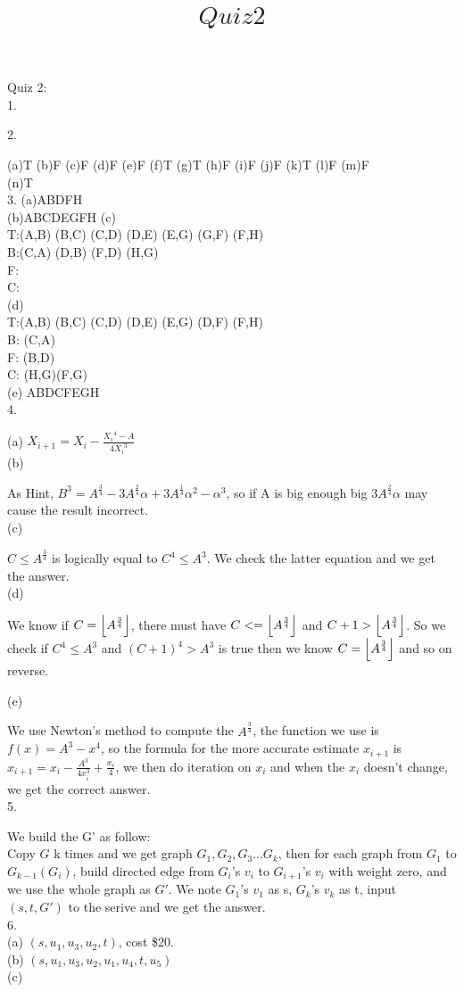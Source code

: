\documentclass[12pt,twoside]{article}
\begin{document}
\title{$Quiz 2$}
Quiz 2:\\
1.

2.

(a)T (b)F (c)F (d)F (e)F (f)T (g)T (h)F (i)F (j)F (k)T (l)F (m)F\\
(n)T\\
3.
(a)ABDFH\\
(b)ABCDEGFH
(c)\\
T:(A,B) (B,C) (C,D) (D,E) (E,G) (G,F) (F,H)\\
B:(C,A) (D,B) (F,D) (H,G)\\
F:\\
C:\\
(d)\\
T:(A,B) (B,C) (C,D) (D,E) (E,G) (D,F) (F,H)\\
B: (C,A)\\
F: (B,D)\\
C: (H,G)(F,G) \\
(e) ABDCFEGH\\
4.

(a) $X_{i+1}=X_i-\frac{{X_i}^4-A}{4{X_i}^3}$\\
(b)

As Hint, $B^3=A^{\frac{3}{4}}-3A^{\frac{2}{4}}\alpha+3A^{\frac{1}{4}}\alpha^2-\alpha^3$, so if A is big enough big $3A^{\frac{2}{4}}\alpha$ may cause the result incorrect.\\
(c)

$C\leq A^{\frac{3}{4}}$ is logically equal to $C^4\leq A^3$. We check the latter equation and we get the answer.\\
(d)

We know if $C=\left\lfloor A^{\frac{3}{4}} \right\rfloor$, there must have $C<=\left\lfloor A^{\frac{3}{4}} \right\rfloor$ and $C+1>\left\lfloor A^{\frac{3}{4}} \right\rfloor$. So we check if $C^4\leq A^3$ and $(C+1)^4>A^3$ is true then we know $C=\left\lfloor A^{\frac{3}{4}} \right\rfloor$ and so on reverse.

(e)

We use Newton's method to compute the $A^{\frac{3}{4}}$, the function we use is $f(x)=A^3-x^4$, so the formula for the more accurate estimate $x_{i+1}$ is $x_{i+1}=x_i-\frac{A^3}{4x_i^3}+\frac{x_i}{4}$, we then do iteration on $x_i$ and when the $x_i$ doesn't change, we get the correct answer.\\
5.

We build the G' as follow:\\
Copy $G$ k times and we get graph $G_1, G_2, G_3...G_k$, then for each graph from $G_1$ to $G_{k-1}(G_i)$, build directed edge from $G_i$'s $v_i$ to $G_{i+1}$'s $v_i$ with weight zero, and we use the whole graph as $G'$. We note $G_1$'s $v_1$ as s, $G_k$'s $v_k$ as t, input $(s,t,G')$ to the serive and we get the answer. \\
6.\\
(a)
$(s,u_1,u_3,u_2,t)$, cost \$20.\\
(b)
$(s,u_1,u_3,u_2,u_1,u_4,t,u_5)$\\
(c)
\end{document}
